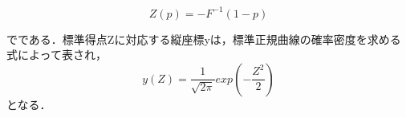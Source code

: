 \documentclass[shuuron]{kuee}
\begin{document}

\begin{equation}
  Z(p) = -F^{-1}(1-p)
\end{equation}

でである．標準得点Zに対応する縦座標yは，標準正規曲線の確率密度を求める式によって表され，
\begin{equation}
  y(Z)=\frac{1}{\sqrt{2\pi}}exp(-\frac{Z^2}{2})
\end{equation}
となる．
%
%
%
%
%

\end{document}

